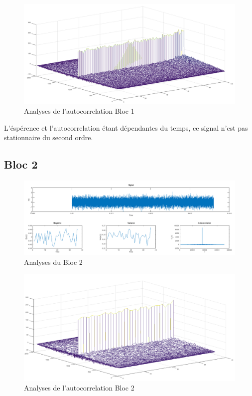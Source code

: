 \documentclass[french, a4paper, 12pt, openany]{book}
\begin{document}
	\begin{figure}[ht]
		\begin{center}
		\includegraphics[scale=0.25]{images/AutoCorrBloc1.png}
		\end{center}
		\caption{Analyses de l'autocorrelation Bloc 1}
		\label{Analyses de l'autocorrelation Bloc 1}
	\end{figure}

	L'éspérence et l'autocorrelation étant dépendantes du temps, ce signal n'est pas stationnaire du second ordre.
  \subsection{Bloc 2}

	\begin{figure}[ht]
		\begin{center}
		\includegraphics[scale=0.25]{images/SignalBloc2.png}
		\end{center}
		\caption{Analyses du Bloc 2}
		\label{Analyses du Bloc 2}
	\end{figure}

	\begin{figure}[ht]
		\begin{center}
		\includegraphics[scale=0.25]{images/AutoCorrBloc2.png}
		\end{center}
		\caption{Analyses de l'autocorrelation Bloc 2}
		\label{Analyses de l'autocorrelation Bloc 2}
	\end{figure}
\end{document}
